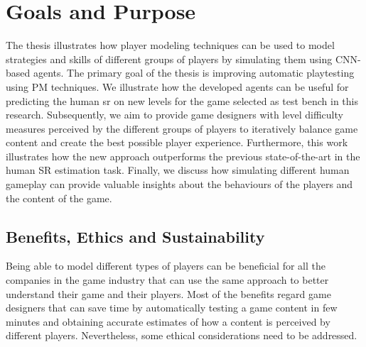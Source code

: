 \section{Goals and Purpose}
The thesis illustrates how player modeling techniques can be used to model strategies and skills of different groups of players by simulating them using \ac{CNN}-based agents. The primary goal of the thesis is improving automatic playtesting using \acl{PM} techniques. We illustrate how the developed agents can be useful for predicting the human \acs{sr} on new levels for the game selected as test bench in this research. Subsequently, we aim to provide game designers with level difficulty measures perceived by the different groups of players to iteratively balance game content and create the best possible player experience. Furthermore, this work illustrates how the new approach outperforms the previous state-of-the-art \cite{eisen_simulating_2017} in the human SR estimation task. Finally, we discuss how simulating different human gameplay can provide valuable insights about the behaviours of the players and the content of the game.



\subsection{Benefits, Ethics and Sustainability}
Being able to model different types of players can be beneficial for all the companies in the game industry that can use the same approach to better understand their game and their players. Most of the benefits regard game designers that can save time by automatically testing a game content in few minutes and obtaining accurate estimates of how a content is perceived by different players. Nevertheless, some ethical considerations need to be addressed. 


